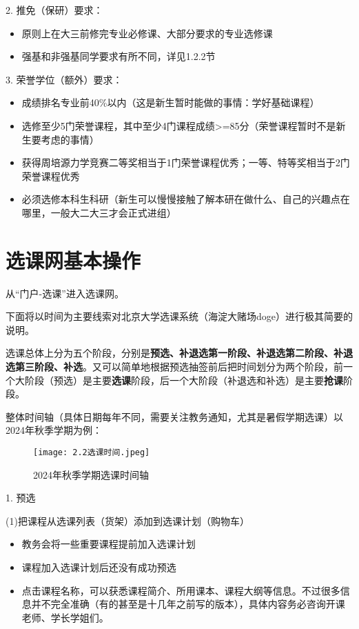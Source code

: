 \documentclass[11pt,oneside]{book}
\begin{document}
2. 推免（保研）要求：

\begin{itemize}
    \item 原则上在大三前修完专业必修课、大部分要求的专业选修课
    \item 强基和非强基同学要求有所不同，详见1.2.2节
\end{itemize}

3. 荣誉学位（额外）要求：

\begin{itemize}
    \item 成绩排名专业前40\%以内（这是新生暂时能做的事情：学好基础课程）
    \item 选修至少5门荣誉课程，其中至少4门课程成绩>=85分（荣誉课程暂时不是新生要考虑的事情）
    \item 获得周培源力学竞赛二等奖相当于1门荣誉课程优秀；一等、特等奖相当于2门荣誉课程优秀
    \item 必须选修本科生科研（新生可以慢慢接触了解本研在做什么、自己的兴趣点在哪里，一般大二大三才会正式进组）
\end{itemize}

\newpage

\section{选课网基本操作}
从“门户-选课”进入选课网。

下面将以时间为主要线索对北京大学选课系统（海淀大赌场doge）进行极其简要的说明。

选课总体上分为五个阶段，分别是\textbf{\textbf{预选、补退选第一阶段、补退选第二阶段、补退选第三阶段、补选}}。又可以简单地根据预选抽签前后把时间划分为两个阶段，前一个大阶段（预选）是主要\textbf{\textbf{选课}}阶段，后一个大阶段（补退选和补选）是主要\textbf{\textbf{抢课}}阶段。

整体时间轴（具体日期每年不同，需要关注教务通知，尤其是暑假学期选课）以2024年秋季学期为例：
\begin{figure}[htbp]
    \centering
    \texttt{[image: 2.2选课时间.jpeg]}
    \renewcommand{\figurename}{图}
    \caption{2024年秋季学期选课时间轴}
    \label{fig:enter-label}
\end{figure}

1. 预选

(1)把课程从选课列表（货架）添加到选课计划（购物车）

\begin{itemize}
    \item  教务会将一些重要课程提前加入选课计划
    \item 课程加入选课计划后还没有成功预选
    \item 点击课程名称，可以获悉课程简介、所用课本、课程大纲等信息。不过很多信息并不完全准确（有的甚至是十几年之前写的版本），具体内容务必咨询开课老师、学长学姐们。
\end{itemize}
\end{document}
